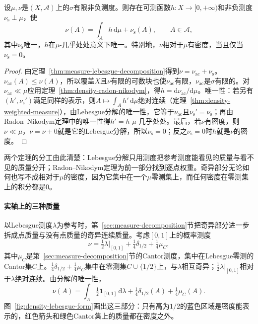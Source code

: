 \begin{theorem}[Lebesgue分解的密度形式（推论）]
\label{thm:density-lebesgue-form}
设$\mu,\nu$是$(X,\mathcal A)$上的$\sigma$有限非负测度。则存在可测函数$h:X\to[0,+\infty)$和非负测度$\nu_{\mathrm s}\perp\mu$，使
\[
 \nu(A)=\int_Ah\,\mathrm d\mu+\nu_{\mathrm s}(A),\qquad A\in\mathcal A,
\]
其中$\nu_{\mathrm s}$唯一，$h$在$\mu$-几乎处处意义下唯一。特别地，$\nu$相对于$\mu$有密度，当且仅当$\nu_{\mathrm s}=0$。
\end{theorem}

\begin{proof}
由定理~\ref{thm:measure-lebesgue-decomposition}得到$\nu=\nu_{\mathrm{ac}}+\nu_{\mathrm s}$。$\nu_{\mathrm{ac}}(A)\le\nu(A)$，所以覆盖$X$且$\nu$有限的可数块也使$\nu_{\mathrm{ac}}$有限，$\nu_{\mathrm{ac}}$是$\sigma$有限的。对$\nu_{\mathrm{ac}}\ll\mu$应用定理~\ref{thm:density-radon-nikodym}，得$h=\mathrm d\nu_{\mathrm{ac}}/\mathrm d\mu$。唯一性：若另有$(h',\nu_{\mathrm s}')$满足同样的表示，则$A\mapsto\int_Ah'\,\mathrm d\mu$绝对连续（定理~\ref{thm:density-weighted-measure}），由Lebesgue分解的唯一性，它等于$\nu_{\mathrm{ac}}$且$\nu_{\mathrm s}'=\nu_{\mathrm s}$；再由Radon–Nikodym定理中的唯一性得$h'=h$ $\mu$-几乎处处。最后，若$\nu$有密度，则$\nu\ll\mu$，$\nu=\nu+0$就是它的Lebesgue分解，所以$\nu_{\mathrm s}=0$；反之$\nu_{\mathrm s}=0$时$h$就是$\nu$的密度。
\end{proof}

两个定理的分工由此清楚：Lebesgue分解只用测度把参考测度能看见的质量与看不见的质量分开；Radon–Nikodym定理为前一部分找到逐点权重。奇异部分无论如何也写不成相对于$\mu$的密度，因为它集中在一个$\mu$零测集上，而任何密度在零测集上的积分都是$0$。

\paragraph{实轴上的三种质量}
以Lebesgue测度$\lambda$为参考时，第~\ref{sec:measure-decomposition}节把奇异部分进一步拆成点质量与没有点质量的奇异连续质量。考虑$[0,1]$上的概率测度
\[
 \nu=\tfrac12\lambda|_{[0,1]}+\tfrac14\delta_{1/2}+\tfrac14\mu_C,
\]
其中$\mu_C$是第~\ref{sec:measure-decomposition}节的Cantor测度，集中在Lebesgue零测的Cantor集$C$上。$\tfrac14\delta_{1/2}+\tfrac14\mu_C$集中在零测集$C\cup\{1/2\}$上，与$\lambda$相互奇异；$\tfrac12\lambda|_{[0,1]}$相对于$\lambda$绝对连续。由分解的唯一性，
\[
 \nu(A)=\int_A\tfrac12\mathbf 1_{[0,1]}\,\mathrm d\lambda+\tfrac14\delta_{1/2}(A)+\tfrac14\mu_C(A).
\]
图~\ref{fig:density-lebesgue-form}画出这三部分：只有高为$1/2$的蓝色区域是密度能表示的，红色箭头和绿色Cantor集上的质量都在密度之外。

